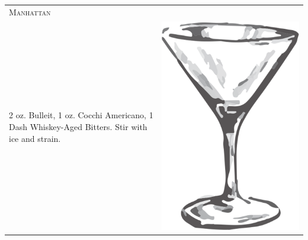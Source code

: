 \documentclass{article}
\begin{document}
\begin{multicols}{2}
\begin{tabular}{p{2in} p{0.5in}}
\multicolumn{2}{p{3in}}{\centering\Huge\textsc{Manhattan}} \\ 
   \vspace{-0.1in}2 oz. Bulleit, 1 oz. Cocchi Americano, 1 Dash Whiskey-Aged Bitters. Stir with ice and strain. &
   \vspace{-0.1in} \includegraphics{goblet.png}
\end{tabular}


\end{multicols}
\end{document}
